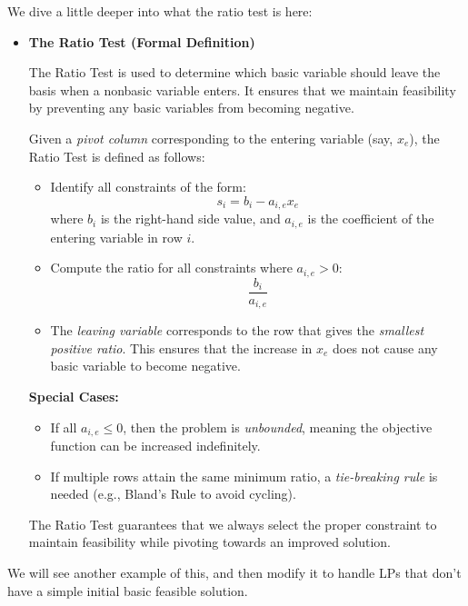 We dive a little deeper into what the ratio test is here:
\begin{itemize}
    \item \textbf{The Ratio Test (Formal Definition)}  

    The Ratio Test is used to determine which basic variable should leave the basis when a nonbasic variable enters. It ensures that we maintain feasibility by preventing any basic variables from becoming negative.

    Given a \emph{pivot column} corresponding to the entering variable (say, \( x_e \)), the Ratio Test is defined as follows:

    \begin{itemize}
        \item Identify all constraints of the form:
        \[
        s_i = b_i - a_{i,e} x_e
        \]
        where \( b_i \) is the right-hand side value, and \( a_{i,e} \) is the coefficient of the entering variable in row \( i \).
        \item Compute the ratio for all constraints where \( a_{i,e} > 0 \):
        \[
        \frac{b_i}{a_{i,e}}
        \]
        \item The \emph{leaving variable} corresponds to the row that gives the \emph{smallest positive ratio}. This ensures that the increase in \( x_e \) does not cause any basic variable to become negative.
    \end{itemize}

    \textbf{Special Cases:}
    \begin{itemize}
        \item If all \( a_{i,e} \leq 0 \), then the problem is \emph{unbounded}, meaning the objective function can be increased indefinitely.
        \item If multiple rows attain the same minimum ratio, a \emph{tie-breaking rule} is needed (e.g., Bland’s Rule to avoid cycling).
    \end{itemize}

    The Ratio Test guarantees that we always select the proper constraint to maintain feasibility while pivoting towards an improved solution.
\end{itemize}


We will see another example of this, and then modify it to handle LPs that don't have a simple initial basic feasible solution.

